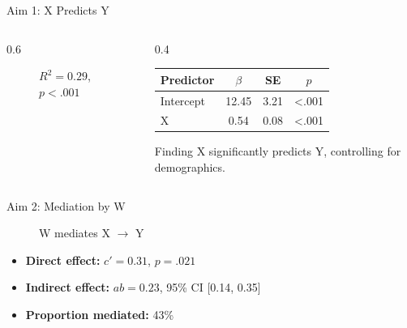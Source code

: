 \documentclass[aspectratio=169,11pt]{beamer}
\begin{document}
\begin{frame}{Aim 1: X Predicts Y}
  \begin{columns}[c]
    \begin{column}{0.6\textwidth}
      \begin{figure}
        \caption{$R^2 = 0.29$, $p < .001$}
      \end{figure}
    \end{column}
    \begin{column}{0.4\textwidth}
      \begin{table}
        \centering\tiny
        \begin{tabular}{lccc}
          \toprule
          \textbf{Predictor} & $\beta$ & SE & $p$ \\
          \midrule
          Intercept & 12.45 & 3.21 & <.001 \\
          X & 0.54 & 0.08 & <.001 \\
          \bottomrule
        \end{tabular}
      \end{table}
      \begin{block}{Finding}
        X significantly predicts Y, controlling for demographics.
      \end{block}
    \end{column}
  \end{columns}
\end{frame}

\begin{frame}{Aim 2: Mediation by W}
  \begin{figure}
    \caption{W mediates X $\to$ Y}
  \end{figure}
  \begin{itemize}
    \item \textbf{Direct effect:} $c' = 0.31$, $p = .021$
    \item \textbf{Indirect effect:} $ab = 0.23$, 95\% CI [0.14, 0.35]
    \item \textbf{Proportion mediated:} 43\%
  \end{itemize}
\end{frame}
\end{document}
